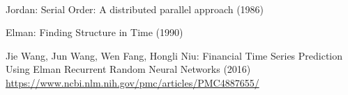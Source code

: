 \documentclass[10pt, a4paper,spanish]{article}
\begin{document}
		\paragraph{}

  \begin{thebibliography}{9}

    	Jordan: Serial Order: A distributed parallel approach (1986)

    	Elman: Finding Structure in Time (1990)

    	Jie Wang, Jun Wang, Wen Fang, Hongli Niu: Financial Time Series Prediction Using Elman Recurrent Random Neural Networks (2016) \url{https://www.ncbi.nlm.nih.gov/pmc/articles/PMC4887655/}
	\end{thebibliography}
\end{document}
